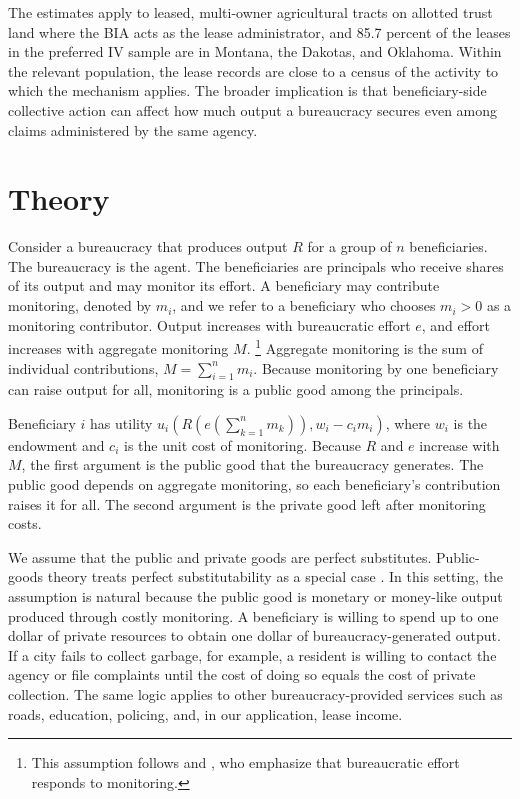 \documentclass[12pt]{article}
\begin{document}
The estimates apply to leased, multi-owner agricultural tracts on allotted trust land where the BIA acts as the lease administrator, and 85.7 percent of the leases in the preferred IV sample are in Montana, the Dakotas, and Oklahoma. Within the relevant population, the lease records are close to a census of the activity to which the mechanism applies. The broader implication is that beneficiary-side collective action can affect how much output a bureaucracy secures even among claims administered by the same agency.

\section{Theory} \label{Theory}

Consider a bureaucracy that produces output $R$ for a group of $n$ beneficiaries. The bureaucracy is the agent. The beneficiaries are principals who receive shares of its output and may monitor its effort. A beneficiary may contribute monitoring, denoted by $m_i$, and we refer to a beneficiary who chooses $m_i>0$ as a monitoring contributor. Output increases with bureaucratic effort $e$, and effort increases with aggregate monitoring $M$.
\footnote{This assumption follows \citet{Prendergast2003} and \citet{Lipsky2010}, who emphasize that bureaucratic effort responds to monitoring.} Aggregate monitoring is the sum of individual contributions, $M=\sum_{i=1}^{n} m_i$. Because monitoring by one beneficiary can raise output for all, monitoring is a public good among the principals.

Beneficiary $i$ has utility $u_i(R(e(\sum_{k=1}^n m_k)), w_i-c_i m_i)$, where $w_i$ is the endowment and $c_i$ is the unit cost of monitoring. Because $R$ and $e$ increase with $M$, the first argument is the public good that the bureaucracy generates. The public good depends on aggregate monitoring, so each beneficiary's contribution raises it for all. The second argument is the private good left after monitoring costs.

We assume that the public and private goods are perfect substitutes. Public-goods theory treats perfect substitutability as a special case \citep{Varian1992, BatinaIhori2005}. In this setting, the assumption is natural because the public good is monetary or money-like output produced through costly monitoring. A beneficiary is willing to spend up to one dollar of private resources to obtain one dollar of bureaucracy-generated output. If a city fails to collect garbage, for example, a resident is willing to contact the agency or file complaints until the cost of doing so equals the cost of private collection. The same logic applies to other bureaucracy-provided services such as roads, education, policing, and, in our application, lease income.
\end{document}
